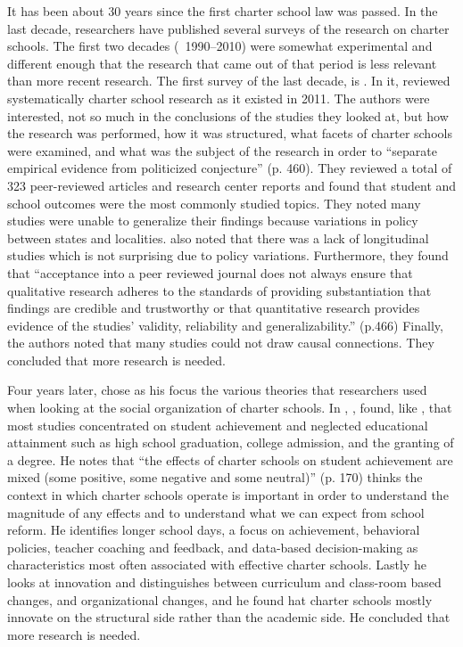 It has been about 30 years since the first charter school law was passed. In the last decade, researchers have published several surveys of the research on charter schools. The first two decades (~1990–2010) were somewhat experimental and different enough that the research that came out of that period is less relevant than more recent research. The first survey of the last decade, is .  In it, \textcite{Smith.etal2011} reviewed systematically charter school research as it existed in 2011. The authors were interested, not so much in the conclusions of the studies they looked at, but how the research was performed, how it was structured, what facets of charter schools were examined, and what was the subject of the research in order to ``separate empirical evidence from politicized conjecture'' (p. 460). They reviewed a total of 323 peer-reviewed articles and research center reports and found that student and school outcomes were the most commonly studied topics. They noted many studies were unable to generalize their findings because variations in policy between states and localities. \citeauthor{Smith.etal2011} also noted that there was a lack of longitudinal studies which is not surprising due to policy variations. Furthermore, they found that ``acceptance into a peer reviewed journal does not always ensure that qualitative research adheres to the standards of providing substantiation that findings are credible and trustworthy or that quantitative research provides evidence of the studies' validity, reliability and generalizability.'' (p.466) Finally, the authors noted that many studies could not draw causal connections. They concluded that more research is needed. %

Four years later, \textcite{Berends2015} chose as his focus the various theories that researchers used when looking at the social organization of charter schools. In , \textcite{Berends2015}, found, like \citeauthor{Smith.etal2011}, that most studies concentrated on student achievement and neglected educational attainment such as high school graduation, college admission, and the granting of a degree. He notes that ``the effects of charter schools on student achievement are mixed (some positive, some negative and some neutral)'' (p. 170) \citeauthor{Berends2015} thinks the context in which charter schools operate is important in order to understand the magnitude of any effects and to understand what we can expect from school reform. He identifies longer school days, a focus on achievement, behavioral policies, teacher coaching and feedback, and data-based decision-making as characteristics most often associated with effective charter schools. Lastly he looks at innovation and distinguishes between curriculum and class-room based changes, and organizational changes, and he found hat charter schools mostly innovate on the structural side rather than the academic side. He concluded that more research is needed.

